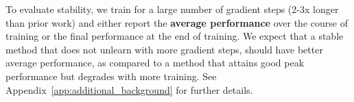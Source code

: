 To evaluate stability, we train for a large number of gradient steps (2-3x longer than prior work) and either report the \textbf{average performance} over the course of training or the final performance at the end of training. %
We expect that a stable method that does not unlearn with more gradient steps, should have better average performance, as compared to a method that attains good peak performance but degrades with more training. See Appendix~\ref{app:additional_background} for further details.






